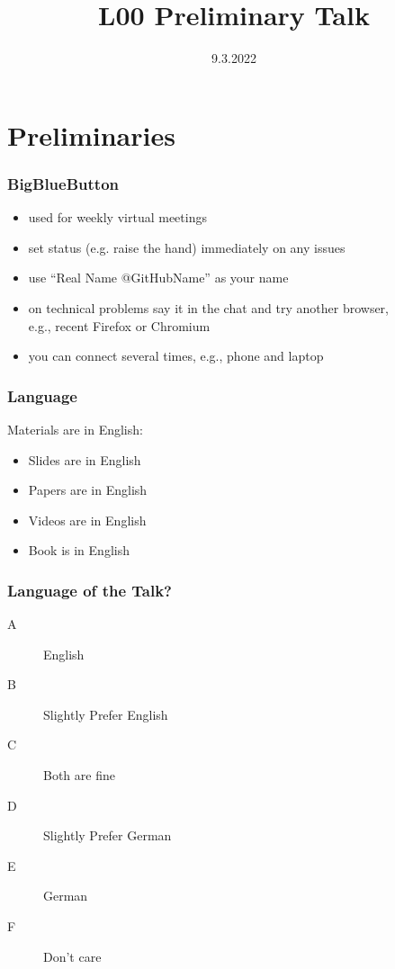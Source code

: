 


\title{L00 Preliminary Talk}
\date{9.3.2022}


\section{Preliminaries}

\begin{frame}
	\frametitle{BigBlueButton}
	\begin{itemize}
		\item used for weekly virtual meetings
		\item set status (e.g. raise the hand) immediately on any issues
		\item use ``Real Name @GitHubName'' as your name
		\item on technical problems say it in the chat
		and try another browser, \\ e.g., recent Firefox or Chromium
		\item you can connect several times, e.g., phone and laptop
	\end{itemize}
\end{frame}

\begin{frame}
	\frametitle{Language}
	Materials are in English:
	\begin{itemize}
		\item Slides are in English
		\item Papers are in English
		\item Videos are in English
		\item Book is in English
	\end{itemize}
\end{frame}

\begin{assignment}
	\frametitle{Language of the Talk?}
	\begin{task}
	\begin{description}
	\item[A] English
	\item[B] Slightly Prefer English
	\item[C] Both are fine
	\item[D] Slightly Prefer German
	\item[E] German
	\item[F] Don't care
	\end{description}
	\end{task}
\end{assignment}

